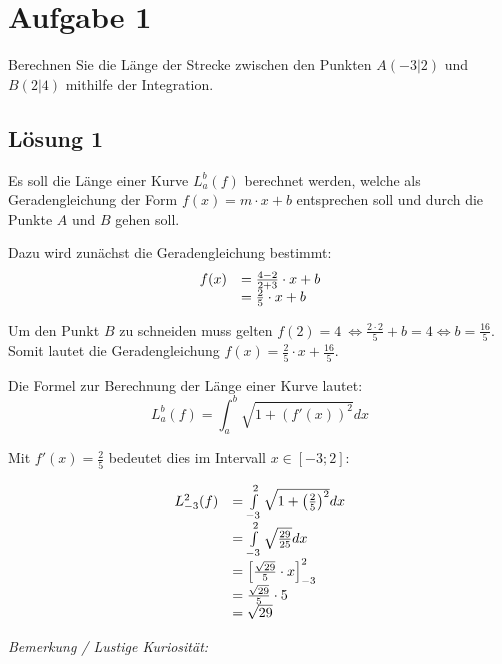 \documentclass[main.tex]{subfiles}
\begin{document}
\section{Aufgabe 1}

Berechnen Sie die Länge der Strecke zwischen den Punkten $A(-3|2)$ und $B( 2|4)$ mithilfe der Integration.

\subsection{Lösung 1}
Es soll die Länge einer Kurve $L_{a}^{b}( f)$ berechnet werden, welche als Geradengleichung der Form $f( x) =m\cdotp x+b$ entsprechen soll und durch die Punkte $A$ und $B$ gehen soll.

Dazu wird zunächst die Geradengleichung bestimmt:
\begin{equation*}
    \begin{array}{ c l }
        f( x) & =\frac{4-2}{2+3} \cdotp x+b\\
        & =\frac{2}{5} \cdotp x+b
    \end{array}
\end{equation*}

Um den Punkt $B$ zu schneiden muss gelten $f( 2) =4\ \Leftrightarrow \frac{2\cdotp 2}{5} +b=4\Leftrightarrow b=\frac{16}{5}$. Somit lautet die Geradengleichung $f( x) =\frac{2}{5} \cdotp x+\frac{16}{5}$.

Die Formel zur Berechnung der Länge einer Kurve lautet:
\begin{equation*}
    L_{a}^{b}( f) =\int _{a}^{b}\sqrt{1+{(f'( x))}^{2}} dx
\end{equation*}

Mit $f'( x) =\frac{2}{5}$ bedeutet dies im Intervall $x\in [ -3;2]$:

\begin{equation*}
    \begin{array}{ c l }
    L_{-3}^{2}( f) & =\int\limits _{-3}^{2}\sqrt{1+{\left(\frac{2}{5}\right)}^{2}} dx\\
    & =\int\limits _{-3}^{2}\sqrt{\frac{29}{25}} dx\\
    & =\left[\frac{\sqrt{29}}{5} \cdotp x\right]_{-3}^{2}\\
    & =\frac{\sqrt{29}}{5} \cdotp 5\\
    & =\sqrt{29}
    \end{array}
\end{equation*}

\textit{Bemerkung / Lustige Kuriosität:}
\end{document}
